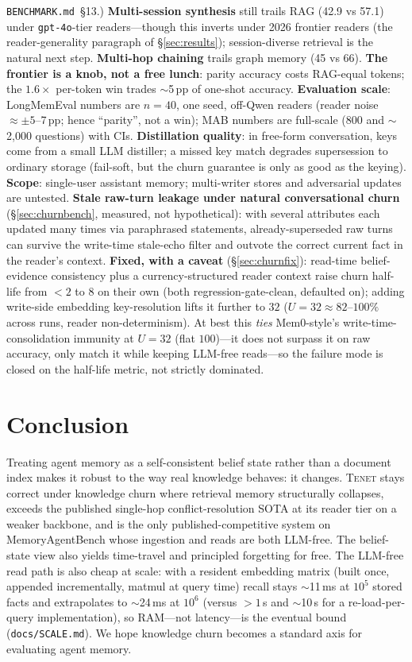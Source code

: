 \documentclass[11pt]{article}
\newcommand{\tenet}{\textsc{Tenet}}
\begin{document}
\texttt{BENCHMARK.md}~\S13.)
\textbf{Multi-session synthesis} still trails RAG (42.9 vs 57.1) under
\texttt{gpt-4o}-tier readers---though this inverts under 2026 frontier readers
(the reader-generality paragraph of \S\ref{sec:results}); session-diverse retrieval is the natural next step. \textbf{Multi-hop chaining} trails graph memory (45
vs 66). \textbf{The frontier is a knob, not a free lunch}: parity accuracy costs
RAG-equal tokens; the $1.6\times$ per-token win trades $\sim$5\,pp of one-shot accuracy.
\textbf{Evaluation scale}: LongMemEval numbers are $n{=}40$, one seed, off-Qwen readers
(reader noise $\approx\pm5$--7\,pp; hence ``parity'', not a win); MAB numbers are
full-scale (800 and $\sim$2{,}000 questions) with CIs. \textbf{Distillation quality}: in
free-form conversation, keys come from a small LLM distiller; a missed key match degrades
supersession to ordinary storage (fail-soft, but the churn guarantee is only as good as
the keying). \textbf{Scope}: single-user assistant memory; multi-writer stores and
adversarial updates are untested. \textbf{Stale raw-turn leakage under natural
conversational churn} (\S\ref{sec:churnbench}, measured, not hypothetical): with several
attributes each updated many times via paraphrased statements, already-superseded raw
turns can survive the write-time stale-echo filter and outvote the correct current fact
in the reader's context. \textbf{Fixed, with a caveat} (\S\ref{sec:churnfix}): read-time belief-evidence
consistency plus a currency-structured reader context raise churn half-life from $<2$ to
$8$ on their own (both regression-gate-clean, defaulted on); adding write-side embedding
key-resolution lifts it further to $32$ ($U{=}32 \approx 82$--$100\%$ across runs, reader
non-determinism). At best this \emph{ties} Mem0-style's write-time-consolidation
immunity at $U{=}32$ (flat $100$)---it does not surpass it on raw accuracy, only match it
while keeping LLM-free reads---so the failure mode is closed on the half-life metric, not
strictly dominated.

\section{Conclusion}
Treating agent memory as a self-consistent belief state rather than a document index
makes it robust to the way real knowledge behaves: it changes. \tenet{} stays correct
under knowledge churn where retrieval memory structurally collapses, exceeds the
published single-hop conflict-resolution SOTA at its reader tier on a weaker backbone,
and is the only published-competitive system on MemoryAgentBench whose ingestion and
reads are both LLM-free. The belief-state view also yields time-travel and principled
forgetting for free. The LLM-free read path is also cheap at scale: with a resident
embedding matrix (built once, appended incrementally, matmul at query time) recall stays
$\sim$11\,ms at $10^5$ stored facts and extrapolates to $\sim$24\,ms at $10^6$ (versus
$>1$\,s and $\sim$10\,s for a re-load-per-query implementation), so RAM---not
latency---is the eventual bound (\texttt{docs/SCALE.md}). We hope knowledge churn becomes
a standard axis for evaluating agent memory.
\end{document}
